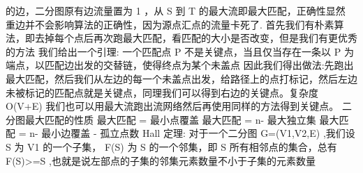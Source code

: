 {} \markdownRendererDollarSign{}的边，二分图原有边流量置为\markdownRendererDollarSign{} 1 \markdownRendererDollarSign{}，从\markdownRendererDollarSign{} S \markdownRendererDollarSign{}到\markdownRendererDollarSign{} T \markdownRendererDollarSign{}的最大流即最大匹配，正确性显然\markdownRendererParagraphSeparator
{}重边并不会影响算法的正确性，因为源点汇点的流量卡死了.\markdownRendererInterblockSeparator
{}
\markdownRendererSectionEnd \markdownRendererSectionBegin
{}\markdownRendererInterblockSeparator
{}首先我们有朴素算法，即去掉每个点后再次跑最大匹配，看匹配的大小是否改变，但是我们有更优秀的方法\markdownRendererParagraphSeparator
{}我们给出一个引理:\markdownRendererParagraphSeparator
{}一个匹配点\markdownRendererDollarSign{} P\markdownRendererSoftLineBreak
{}\markdownRendererDollarSign{}不是关键点，当且仅当存在一条以\markdownRendererDollarSign{} P \markdownRendererDollarSign{}为端点，以匹配边出发的交替链，使得终点为某个未盖点\markdownRendererParagraphSeparator
{}因此我们得出做法:先跑出最大匹配，然后我们从左边的每一个未盖点出发，给路径上的点打标记，然后左边未被标记的匹配点就是关键点，同理我们可以得到右边的关键点。复杂度\markdownRendererDollarSign{} O(V+E) \markdownRendererDollarSign{}\markdownRendererParagraphSeparator
{}我们也可以用最大流跑出流网络然后再使用同样的方法得到关键点。\markdownRendererInterblockSeparator
{}\markdownRendererInterblockSeparator
{}二分图最大匹配的性质\markdownRendererParagraphSeparator
{}最大匹配\markdownRendererDollarSign{} = \markdownRendererDollarSign{}最小点覆盖\markdownRendererParagraphSeparator
{}最大匹配\markdownRendererDollarSign{} = \markdownRendererDollarSign{}\markdownRendererDollarSign{} n- \markdownRendererDollarSign{}最大独立集\markdownRendererParagraphSeparator
{}最大匹配\markdownRendererDollarSign{} = \markdownRendererDollarSign{}\markdownRendererDollarSign{} n- \markdownRendererDollarSign{}最小边覆盖\markdownRendererDollarSign{} - \markdownRendererDollarSign{}孤立点数\markdownRendererParagraphSeparator
{}\markdownRendererDollarSign{} Hall\markdownRendererSoftLineBreak
{}\markdownRendererDollarSign{}定理:\markdownRendererParagraphSeparator
{}对于一个二分图\markdownRendererDollarSign{} G=(V1,V2,E) \markdownRendererDollarSign{},我们设\markdownRendererDollarSign{} S \markdownRendererDollarSign{}为\markdownRendererDollarSign{} V1 \markdownRendererDollarSign{}的一个子集，\markdownRendererDollarSign{} F(S) \markdownRendererDollarSign{}为\markdownRendererDollarSign{} S \markdownRendererDollarSign{}的一个邻集，即\markdownRendererDollarSign{} S \markdownRendererDollarSign{}所有相邻点的集合，总有\markdownRendererDollarSign{} \markdownRendererPipe{}F(S)\markdownRendererPipe{}>=\markdownRendererPipe{}S\markdownRendererPipe{} \markdownRendererDollarSign{},也就是说左部点的子集的邻集元素数量不小于子集的元素数量\markdownRendererParagraphSeparator
